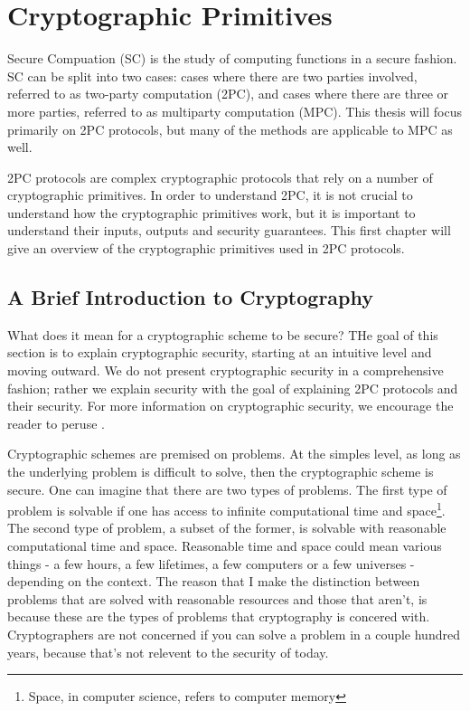 \chapter{Cryptographic Primitives}
Secure Compuation (SC) is the study of computing functions in a secure fashion. 
SC can be split into two cases: cases where there are two parties involved, referred to as two-party computation (2PC), and cases where there are three or more parties, referred to as multiparty computation (MPC).
This thesis will focus primarily on 2PC protocols, but many of the methods are applicable to MPC as well.

2PC protocols are complex cryptographic protocols that rely on a number of cryptographic primitives.
In order to understand 2PC, it is not crucial to understand how the cryptographic primitives work, but it is important to understand their inputs, outputs and security guarantees. 
This first chapter will give an overview of the cryptographic primitives used in 2PC protocols.

\section{A Brief Introduction to Cryptography} 
What does it mean for a cryptographic scheme to be secure? 
THe goal of this section is to explain cryptographic security, starting at an intuitive level and moving outward. 
We do not present cryptographic security in a comprehensive fashion; rather we explain security with the goal of explaining 2PC protocols and their security.
For more information on cryptographic security, we encourage the reader to peruse \cite{textbook}. 

Cryptographic schemes are premised on problems. 
At the simples level, as long as the underlying problem is difficult to solve, then the cryptographic scheme is secure.
One can imagine that there are two types of problems.
The first type of problem is solvable if one has access to infinite computational time and space\footnote{Space, in computer science, refers to computer memory}. 
The second type of problem, a subset of the former, is solvable with reasonable computational time and space. 
Reasonable time and space could mean various things - a few hours, a few lifetimes, a few computers or a few universes - depending on the context. 
The reason that I make the distinction between problems that are solved with reasonable resources and those that aren't, is because these are the types of problems that cryptography is concered with. 
Cryptographers are not concerned if you can solve a problem in a couple hundred years, because that's not relevent to the security of today. 

